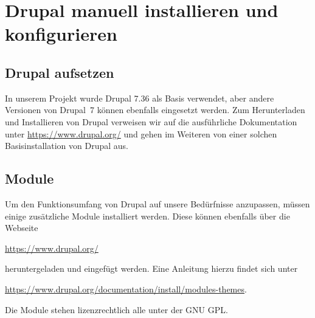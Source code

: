 \documentclass[a4paper,11pt,twoside]{article}
\begin{document}
\section{Drupal manuell installieren und konfigurieren}
\subsection{Drupal aufsetzen}

In unserem Projekt wurde Drupal 7.36 als Basis verwendet, aber andere Versionen
von Drupal~7 können ebenfalls eingesetzt werden.  Zum Herunterladen und
Installieren von Drupal verweisen wir auf die ausführliche Dokumentation unter
\url{https://www.drupal.org/} und gehen im Weiteren von einer solchen
Basisinstallation von Drupal aus.

\subsection{Module}
Um den Funktionsumfang von Drupal auf unsere Bedürfnisse anzupassen, müssen
einige zusätzliche Module installiert werden. Diese können ebenfalls über die
Webseite 
\begin{center}
  \url{https://www.drupal.org/}
\end{center}
heruntergeladen und eingefügt werden.  Eine Anleitung hierzu findet sich unter
\begin{center}
  \url{https://www.drupal.org/documentation/install/modules-themes}.
\end{center}
Die Module stehen lizenzrechtlich alle unter der GNU GPL.
\end{document}
